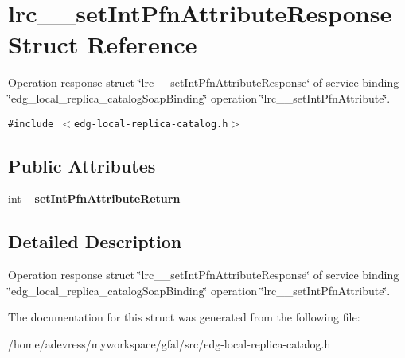 \section{lrc\_\-\_\-set\-Int\-Pfn\-Attribute\-Response Struct Reference}
\label{structlrc____setIntPfnAttributeResponse}
Operation response struct \char`\"{}lrc\_\-\_\-set\-Int\-Pfn\-Attribute\-Response\char`\"{} of service binding \char`\"{}edg\_\-local\_\-replica\_\-catalog\-Soap\-Binding\char`\"{} operation \char`\"{}lrc\_\-\_\-set\-Int\-Pfn\-Attribute\char`\"{}.  


{\tt \#include $<$edg-local-replica-catalog.h$>$}

\subsection*{Public Attributes}
\begin{CompactItemize}
\item 
int \textbf{\_\-set\-Int\-Pfn\-Attribute\-Return}\label{structlrc____setIntPfnAttributeResponse_72f32b21645465bf65607e8cd685f63f}

\end{CompactItemize}


\subsection{Detailed Description}
Operation response struct \char`\"{}lrc\_\-\_\-set\-Int\-Pfn\-Attribute\-Response\char`\"{} of service binding \char`\"{}edg\_\-local\_\-replica\_\-catalog\-Soap\-Binding\char`\"{} operation \char`\"{}lrc\_\-\_\-set\-Int\-Pfn\-Attribute\char`\"{}. 



The documentation for this struct was generated from the following file:\begin{CompactItemize}
\item 
/home/adevress/myworkspace/gfal/src/edg-local-replica-catalog.h\end{CompactItemize}
